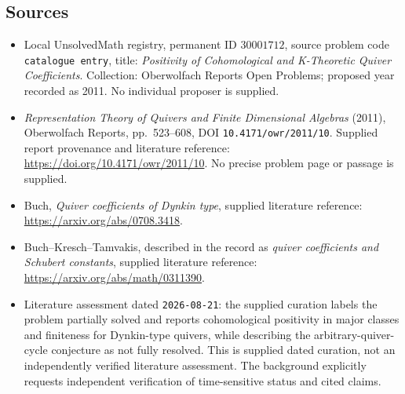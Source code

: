 \documentclass[11pt]{article}
\begin{document}
\subsection{Sources}
\begin{itemize}
\item Local UnsolvedMath registry, permanent ID \(30001712\), source problem code \texttt{catalogue entry}, title: \emph{Positivity of Cohomological and K-Theoretic Quiver Coefficients}. Collection: Oberwolfach Reports Open Problems; proposed year recorded as 2011. No individual proposer is supplied.
\item \emph{Representation Theory of Quivers and Finite Dimensional Algebras} (2011), Oberwolfach Reports, pp.\ 523--608, DOI \texttt{10.4171/owr/2011/10}. Supplied report provenance and literature reference: \url{https://doi.org/10.4171/owr/2011/10}. No precise problem page or passage is supplied.
\item Buch, \emph{Quiver coefficients of Dynkin type}, supplied literature reference: \url{https://arxiv.org/abs/0708.3418}.
\item Buch--Kresch--Tamvakis, described in the record as \emph{quiver coefficients and Schubert constants}, supplied literature reference: \url{https://arxiv.org/abs/math/0311390}.
\item Literature assessment dated \texttt{2026-08-21}: the supplied curation labels the problem partially solved and reports cohomological positivity in major classes and finiteness for Dynkin-type quivers, while describing the arbitrary-quiver-cycle conjecture as not fully resolved. This is supplied dated curation, not an independently verified literature assessment. The background explicitly requests independent verification of time-sensitive status and cited claims.
\end{itemize}
\end{document}
